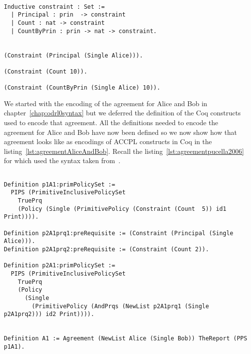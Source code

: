 \lstset{language=Coq}
\begin{lstlisting}[frame=single, caption={Constraint Definition and the Three Kinds of Constraints},label={lst:exampleconst}]

Inductive constraint : Set :=
  | Principal : prin  -> constraint 
  | Count : nat -> constraint 
  | CountByPrin : prin -> nat -> constraint.


(Constraint (Principal (Single Alice))).

(Constraint (Count 10)).

(Constraint (CountByPrin (Single Alice) 10)).

\end{lstlisting}


We started with the encoding of the agreement for Alice and Bob in chapter~\ref{chap:odrl0syntax} but we deferred the definition of the Coq constructs used to encode that agreement. All the definitions needed to encode the agreement for Alice and Bob have now been defined so we now show how that agreement looks like as encodings of \ac{ACCPL} constructs in Coq in the listing~\ref{lst:agreementAliceAndBob}. Recall the listing~\ref{lst:agreementpucella2006} for  which used the syntax taken from~\cite{pucella2006}.



\lstset{language=Coq}
\begin{lstlisting}[frame=single, caption={Agreement for Alice and Bob in \ac{ACCPL}},label={lst:agreementAliceAndBob}]

Definition p1A1:primPolicySet :=
  PIPS (PrimitiveInclusivePolicySet
    TruePrq
    (Policy (Single (PrimitivePolicy (Constraint (Count  5)) id1 Print)))).

Definition p2A1prq1:preRequisite := (Constraint (Principal (Single Alice))).
Definition p2A1prq2:preRequisite := (Constraint (Count 2)).

Definition p2A1:primPolicySet :=
  PIPS (PrimitiveInclusivePolicySet
    TruePrq
    (Policy 
      (Single 
        (PrimitivePolicy (AndPrqs (NewList p2A1prq1 (Single p2A1prq2))) id2 Print)))).


Definition A1 := Agreement (NewList Alice (Single Bob)) TheReport (PPS p1A1).
\end{lstlisting}	


